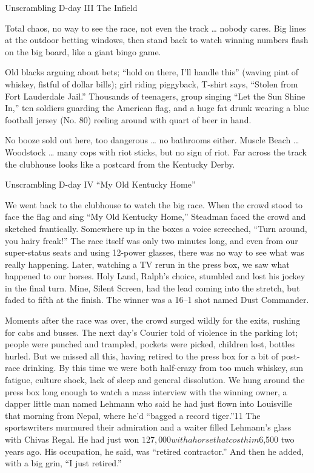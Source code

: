 \documentclass[10pt,a4paper]{article}
\begin{document}
Unscrambling D-day III
The Infield

Total chaos, no way to see the race, not even the track … nobody cares. Big lines at the outdoor betting windows, then stand back to watch winning numbers flash on the big board, like a giant bingo game.

Old blacks arguing about bets; “hold on there, I’ll handle this” (waving pint of whiskey, fistful of dollar bills); girl riding piggyback, T-shirt says, “Stolen from Fort Lauderdale Jail.” Thousands of teenagers, group singing “Let the Sun Shine In,” ten soldiers guarding the American flag, and a huge fat drunk wearing a blue football jersey (No. 80) reeling around with quart of beer in hand.

No booze sold out here, too dangerous … no bathrooms either. Muscle Beach … Woodstock … many cops with riot sticks, but no sign of riot. Far across the track the clubhouse looks like a postcard from the Kentucky Derby.

Unscrambling D-day IV
“My Old Kentucky Home”

We went back to the clubhouse to watch the big race. When the crowd stood to face the flag and sing “My Old Kentucky Home,” Steadman faced the crowd and sketched frantically. Somewhere up in the boxes a voice screeched, “Turn around, you hairy freak!” The race itself was only two minutes long, and even from our super-status seats and using 12-power glasses, there was no way to see what was really happening. Later, watching a TV rerun in the press box, we saw what happened to our horses. Holy Land, Ralph’s choice, stumbled and lost his jockey in the final turn. Mine, Silent Screen, had the lead coming into the stretch, but faded to fifth at the finish. The winner was a 16–1 shot named Dust Commander.

Moments after the race was over, the crowd surged wildly for the exits, rushing for cabs and busses. The next day’s Courier told of violence in the parking lot; people were punched and trampled, pockets were picked, children lost, bottles hurled. But we missed all this, having retired to the press box for a bit of post-race drinking. By this time we were both half-crazy from too much whiskey, sun fatigue, culture shock, lack of sleep and general dissolution. We hung around the press box long enough to watch a mass interview with the winning owner, a dapper little man named Lehmann who said he had just flown into Louisville that morning from Nepal, where he’d “bagged a record tiger.”11 The sportswriters murmured their admiration and a waiter filled Lehmann’s glass with Chivas Regal. He had just won $127,000 with a horse that cost him $6,500 two years ago. His occupation, he said, was “retired contractor.” And then he added, with a big grin, “I just retired.”
\end{document}

